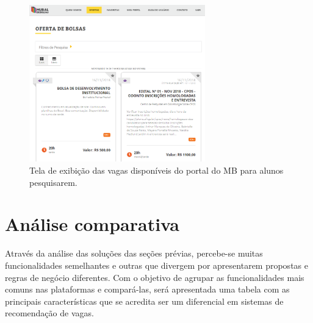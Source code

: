 \begin{figure}[h]
    \caption{Tela de exibição das vagas disponíveis do portal do MB para alunos pesquisarem.}
       	\begin{center}
            \includegraphics[width=0.68\textwidth]{figuras/rel07.png}
        \end{center}
    \label{telaVagasMB}
\end{figure}

\section{Análise comparativa}
\label{trabRelAnalise}

Através da análise das soluções das seções prévias, percebe-se muitas funcionalidades semelhantes e outras que divergem por apresentarem propostas e regras de negócio diferentes. Com o objetivo de agrupar as funcionalidades mais comuns nas plataformas e compará-las, será apresentada uma tabela com as principais características que se acredita ser um diferencial em sistemas de recomendação de vagas. 


